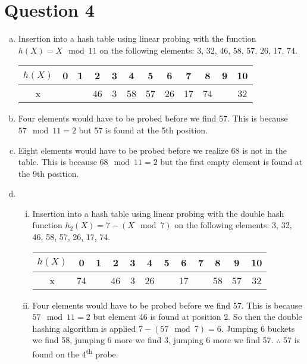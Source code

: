 \documentclass[fleqn, 12pt]{article}
\begin{document}
\section*{Question 4}

\begin{enumerate}[a)]
\item Insertion into a hash table using linear probing with the function $h(X)=X\mod11$ on the following elements: 3, 32, 46, 58, 57, 26, 17, 74.
    \begin{center}
        \begin{tabular}{|*{12}{c|}}
            \hline
            $h(X)$ & 0 & 1 & 2 & 3 & 4 & 5 & 6 & 7 & 8 & 9 & 10\\ \hline
            x & & & 46 & 3 & 58 & 57 & 26 & 17 & 74 &  & 32\\
            \hline
        \end{tabular}
    \end{center}

\item Four elements would have to be probed before we find 57. This is because $57\mod11=2$ but 57 is found at the 5th position.

\item Eight elements would have to be probed before we realize 68 is not in the table. This is because $68\mod11=2$ but the first empty element is found at the 9th position.

\item
    \begin{enumerate}[i)]
    \item Insertion into a hash table using linear probing with the double hash function $h_2(X)=7-(X\mod7)$ on the following elements: 3, 32, 46, 58, 57, 26, 17, 74.
    \begin{center}
        \begin{tabular}{|*{12}{c|}}
            \hline
            $h(X)$ & 0 & 1 & 2 & 3 & 4 & 5 & 6 & 7 & 8 & 9 & 10\\ \hline
            x & 74 & & 46 & 3 & 26 & & 17 & & 58 & 57 & 32\\
            \hline
        \end{tabular}
    \end{center}

    \item Four elements would have to be probed before we find 57. This is because $57\mod11=2$ but element 46 is found at position 2. So then the double hashing algorithm is applied $7-(57\mod7)=6$. Jumping 6 buckets we find 58, jumping 6 more we find 3, jumping 6 more we find 57. $\therefore$ 57 is found on the 4\textsuperscript{th} probe.


\end{enumerate}
\end{enumerate}
\end{document}
